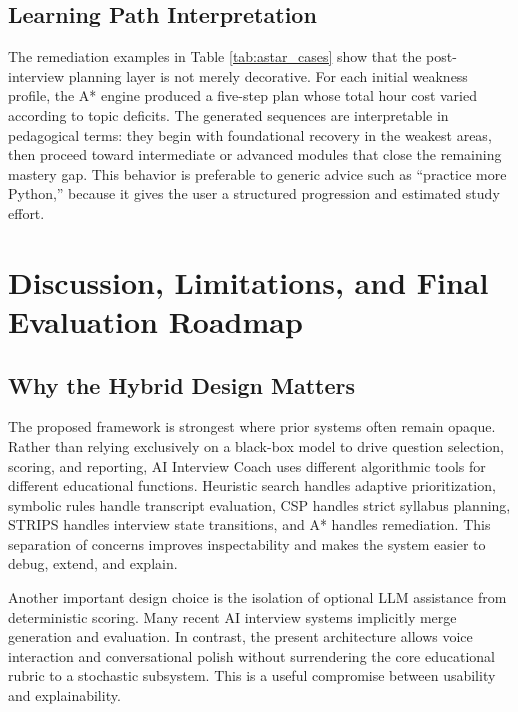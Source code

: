 \documentclass[conference]{IEEEtran}
\begin{document}
\subsection{Learning Path Interpretation}
The remediation examples in Table \ref{tab:astar_cases} show that the post-interview planning layer is not merely decorative. For each initial weakness profile, the A* engine produced a five-step plan whose total hour cost varied according to topic deficits. The generated sequences are interpretable in pedagogical terms: they begin with foundational recovery in the weakest areas, then proceed toward intermediate or advanced modules that close the remaining mastery gap. This behavior is preferable to generic advice such as ``practice more Python,'' because it gives the user a structured progression and estimated study effort.

\section{Discussion, Limitations, and Final Evaluation Roadmap}
\subsection{Why the Hybrid Design Matters}
The proposed framework is strongest where prior systems often remain opaque. Rather than relying exclusively on a black-box model to drive question selection, scoring, and reporting, AI Interview Coach uses different algorithmic tools for different educational functions. Heuristic search handles adaptive prioritization, symbolic rules handle transcript evaluation, CSP handles strict syllabus planning, STRIPS handles interview state transitions, and A* handles remediation. This separation of concerns improves inspectability and makes the system easier to debug, extend, and explain.

Another important design choice is the isolation of optional LLM assistance from deterministic scoring. Many recent AI interview systems implicitly merge generation and evaluation. In contrast, the present architecture allows voice interaction and conversational polish without surrendering the core educational rubric to a stochastic subsystem. This is a useful compromise between usability and explainability.
\end{document}
